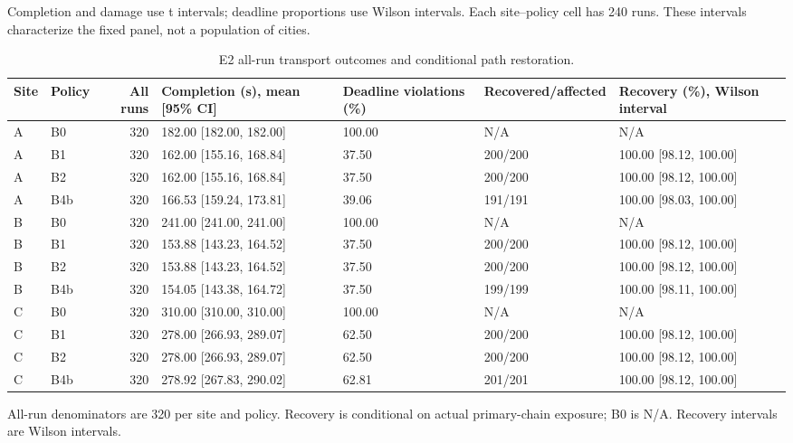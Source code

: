 \documentclass[11pt,a4paper]{article}
\begin{document}
Completion and damage use t intervals; deadline proportions use Wilson intervals. Each site--policy cell has 240 runs. These intervals characterize the fixed panel, not a population of cities.

\begin{table}[H]
\centering
\small
\setlength{\tabcolsep}{3pt}
\caption{E2 all-run transport outcomes and conditional path restoration.}
\label{tab:S2}
\begin{tabularx}{\textwidth}{@{}llrYYYY@{}}
\toprule
Site & Policy & All runs & Completion (s), mean [95\% CI] & Deadline violations (\%) & Recovered/affected & Recovery (\%), Wilson interval \\
\midrule
A & B0 & 320 & 182.00 [182.00, 182.00] & 100.00 & N/A & N/A \\
A & B1 & 320 & 162.00 [155.16, 168.84] & 37.50 & 200/200 & 100.00 [98.12, 100.00] \\
A & B2 & 320 & 162.00 [155.16, 168.84] & 37.50 & 200/200 & 100.00 [98.12, 100.00] \\
A & B4b & 320 & 166.53 [159.24, 173.81] & 39.06 & 191/191 & 100.00 [98.03, 100.00] \\
B & B0 & 320 & 241.00 [241.00, 241.00] & 100.00 & N/A & N/A \\
B & B1 & 320 & 153.88 [143.23, 164.52] & 37.50 & 200/200 & 100.00 [98.12, 100.00] \\
B & B2 & 320 & 153.88 [143.23, 164.52] & 37.50 & 200/200 & 100.00 [98.12, 100.00] \\
B & B4b & 320 & 154.05 [143.38, 164.72] & 37.50 & 199/199 & 100.00 [98.11, 100.00] \\
C & B0 & 320 & 310.00 [310.00, 310.00] & 100.00 & N/A & N/A \\
C & B1 & 320 & 278.00 [266.93, 289.07] & 62.50 & 200/200 & 100.00 [98.12, 100.00] \\
C & B2 & 320 & 278.00 [266.93, 289.07] & 62.50 & 200/200 & 100.00 [98.12, 100.00] \\
C & B4b & 320 & 278.92 [267.83, 290.02] & 62.81 & 201/201 & 100.00 [98.12, 100.00] \\
\bottomrule
\end{tabularx}
\end{table}

All-run denominators are 320 per site and policy. Recovery is conditional on actual primary-chain exposure; B0 is N/A. Recovery intervals are Wilson intervals.
\end{document}
